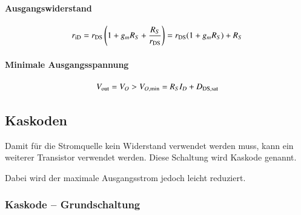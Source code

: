 \begin{minipage}[t]{0.62\columnwidth}
    \paragraph{Ausgangswiderstand}

    \vspace{-0.4cm}
    \[
        r_{\rm iD} = r_{\rm DS} \left( 1 + g_m R_S + \frac{R_S}{r_{\rm DS}} \right) = r_{\rm DS} (1 + g_m R_S) + R_S 
    \]
            

    \paragraph{Minimale Ausgangsspannung}

    \vspace{-0.2cm}

    \[
        V_{\rm out} = V_O > V_{O , \rm min} = R_S I_D + D_{\rm DS, sat}
    \]
\end{minipage}


\subsection{Kaskoden}
Damit für die Stromquelle kein Widerstand verwendet werden muss, kann ein weiterer Transistor verwendet werden. Diese Schaltung wird Kaskode genannt.

Dabei wird der maximale Ausgangsstrom jedoch leicht reduziert.


\subsubsection{Kaskode -- Grundschaltung}
\label{Kaskode -- Grundschaltung}

